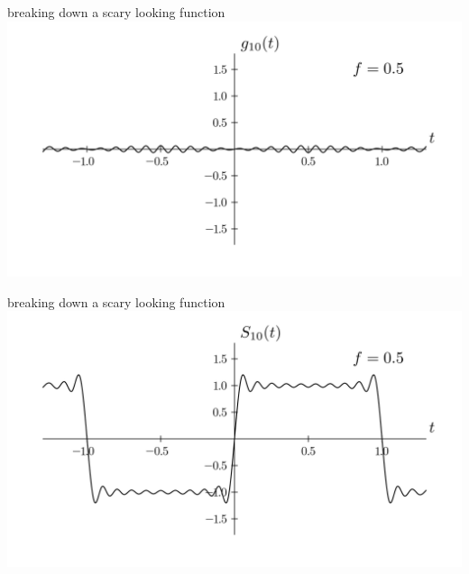 \documentclass{beamer}
\begin{document}
	\begin{frame}{breaking down a scary looking function}
		\includegraphics[width=\linewidth,height=0.85\textheight,keepaspectratio]{../assets/tenth-term-function.png}
	\end{frame}
	
	\begin{frame}{breaking down a scary looking function}
		\includegraphics[width=\linewidth,height=0.85\textheight,keepaspectratio]{../assets/sum-ten-terms.png}
	\end{frame}
	
\end{document}
